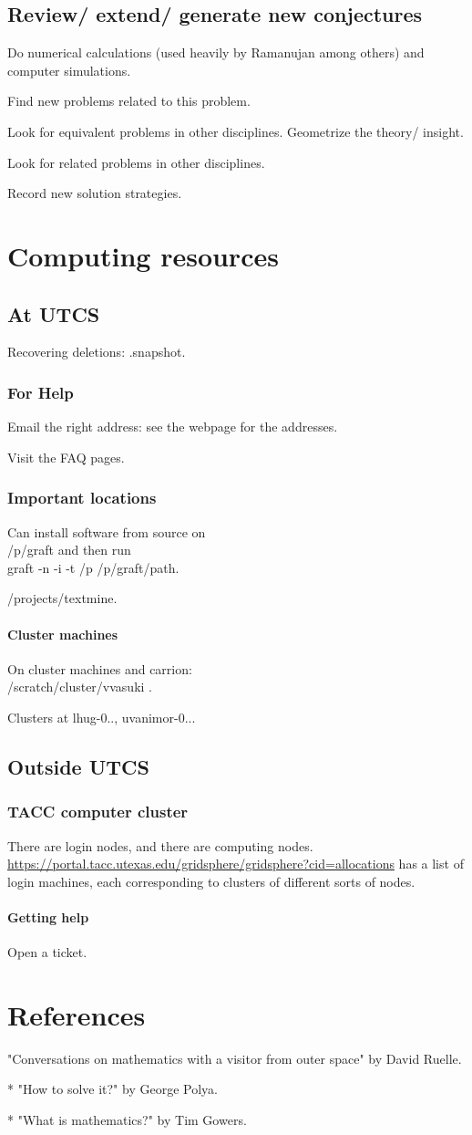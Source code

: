 \documentclass[oneside, article]{memoir}
\begin{document}
\section{Review/ extend/ generate new conjectures}
Do numerical calculations (used heavily by Ramanujan among others) and computer simulations.

Find new problems related to this problem.

Look for equivalent problems in other disciplines. Geometrize the theory/ insight.

Look for related problems in other disciplines.

Record new solution strategies.

\chapter{Computing resources}
\section{At UTCS}
Recovering deletions: .snapshot.

\subsection{For Help}
Email the right address: see the webpage for the addresses.

Visit the FAQ pages.

\subsection{Important locations}
Can install software from source on \\
/p/graft and then run \\
graft -n -i -t /p /p/graft/path.

/projects/textmine.

\subsubsection{Cluster machines}
On cluster machines and carrion: \\
/scratch/cluster/vvasuki .

Clusters at lhug-0.., uvanimor-0...

\section{Outside UTCS}
\subsection{TACC computer cluster}
There are login nodes, and there are computing nodes. \url{https://portal.tacc.utexas.edu/gridsphere/gridsphere?cid=allocations} has a list of login machines, each corresponding to clusters of different sorts of nodes.

\subsubsection{Getting help}
Open a ticket.

\chapter{References}
"Conversations on mathematics with a visitor from outer space" by David Ruelle.

* "How to solve it?" by George Polya.

* "What is mathematics?" by Tim Gowers.
\end{document}
